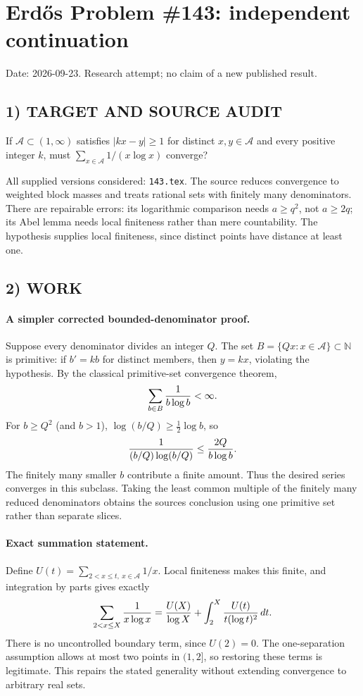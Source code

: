 \section{Erd\H{o}s Problem \#143: independent continuation}
\noindent Date: 2026-09-23. Research attempt; no claim of a new published result.
\subsection{1) TARGET AND SOURCE AUDIT}
If $\mathcal A\subset(1,\infty)$ satisfies $|kx-y|\ge1$ for distinct $x,y\in\mathcal A$ and every positive integer $k$, must $\sum_{x\in\mathcal A}1/(x\log x)$ converge?

All supplied versions considered: \texttt{143.tex}.
The source reduces convergence to weighted block masses and treats rational sets with finitely many denominators. There are repairable errors: its logarithmic comparison needs $a\ge q^2$, not $a\ge2q$; its Abel lemma needs local finiteness rather than mere countability. The hypothesis supplies local finiteness, since distinct points have distance at least one.
\subsection{2) WORK}
\paragraph{A simpler corrected bounded-denominator proof.}
Suppose every denominator divides an integer $Q$. The set $B=\{Qx:x\in\mathcal A\}\subset\mathbb N$ is primitive: if $b'=kb$ for distinct members, then $y=kx$, violating the hypothesis. By the classical primitive-set convergence theorem,
\[
\sum_{b\in B}{1\over b\log b}<\infty.
\]
For $b\ge Q^2$ (and $b>1$), $\log(b/Q)\ge\tfrac12\log b$, so
\[
{1\over (b/Q)\log(b/Q)}\le {2Q\over b\log b}.
\]
The finitely many smaller $b$ contribute a finite amount. Thus the desired series converges in this subclass. Taking the least common multiple of the finitely many reduced denominators obtains the source\textquotesingle s conclusion using one primitive set rather than separate slices.

\paragraph{Exact summation statement.}
Define $U(t)=\sum_{2<x\le t,\ x\in\mathcal A}1/x$. Local finiteness makes this finite, and integration by parts gives exactly
\[
\sum_{2<x\le X}{1\over x\log x}={U(X)\over\log X}+\int_2^X{U(t)\over t(\log t)^2}\,dt.
\]
There is no uncontrolled boundary term, since $U(2)=0$. The one-separation assumption allows at most two points in $(1,2]$, so restoring these terms is legitimate. This repairs the stated generality without extending convergence to arbitrary real sets.
